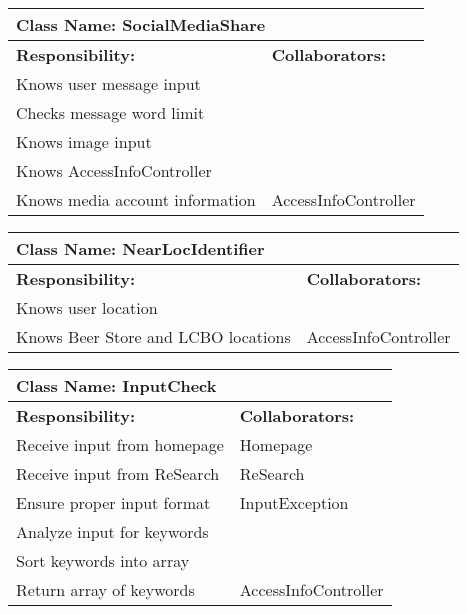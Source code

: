 \documentclass[]{article}
\begin{document}
	\begin{table}[ht]
		\centering
		\begin{tabular}{|p{5cm}|p{5cm}|}
			\hline 
			\multicolumn{2}{|l|}{\textbf{Class Name: SocialMediaShare}} \\
			\hline
			\textbf{Responsibility:} & \textbf{Collaborators:} \\
			\hline
			Knows user message input  & \\
			\hline
			Checks message word limit & \\
			\hline
			Knows image input & \\
			\hline
			Knows AccessInfoController & \\
			\hline
			Knows media account information & AccessInfoController\\
			\hline 
		\end{tabular}
	\end{table}	
	
	\begin{table}[ht]
		\centering
		\begin{tabular}{|p{5cm}|p{5cm}|}
			\hline 
			\multicolumn{2}{|l|}{\textbf{Class Name: NearLocIdentifier}} \\
			\hline
			\textbf{Responsibility:} & \textbf{Collaborators:} \\
			\hline
			Knows user location & \\
			\hline
			Knows Beer Store and LCBO locations & AccessInfoController\\
			\hline
		\end{tabular}
	\end{table}	
	
	\begin{table}[ht]
		\centering
		\begin{tabular}{|p{5cm}|p{5cm}|}
			\hline 
			\multicolumn{2}{|l|}{\textbf{Class Name: InputCheck}} \\
			\hline
			\textbf{Responsibility:} & \textbf{Collaborators:} \\
			\hline
			Receive input from homepage  & Homepage\\
			\hline
			Receive input from ReSearch & ReSearch\\
			\hline
			Ensure proper input format & InputException\\
			\hline
			Analyze input for keywords & \\
			\hline
			Sort keywords into array & \\
			\hline 
			Return array of keywords & AccessInfoController\\
			\hline 
		\end{tabular}
	\end{table}	
\end{document}
